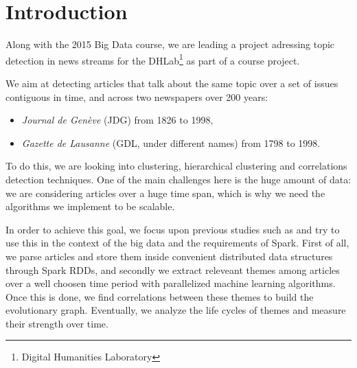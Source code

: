 \section{Introduction}
Along with the 2015 Big Data course, we are leading a project adressing topic detection in news streams for the DHLab\footnote{Digital Humanities Laboratory} as part of a course project.

We aim at detecting articles that talk about the same topic over a set of issues contiguous in time, and across two newspapers over 200 years:
\begin{itemize}
\item \emph{Journal de Genève} (JDG) from 1826 to 1998,
\item \emph{Gazette de Lausanne} (GDL, under different names) from 1798 to 1998.
\end{itemize}
 To do this, we are looking into clustering, hierarchical clustering and correlations detection techniques. One of the main challenges here is the huge amount of data: we are considering articles over a huge time span, which is why we need the algorithms we implement to be scalable.

In order to achieve this goal, we focus upon previous studies such as \cite{kdd05-ttm} and try to use this in the context of the big data and the requirements of Spark.
First of all, we parse articles and store them inside convenient distributed data structures through Spark RDDs, and secondly we extract releveant themes among articles over a well choosen time period with parallelized machine learning algorithms. Once this is done, we find correlations between these themes to build the evolutionary graph. Eventually, we analyze the life cycles of themes and measure their strength over time.
